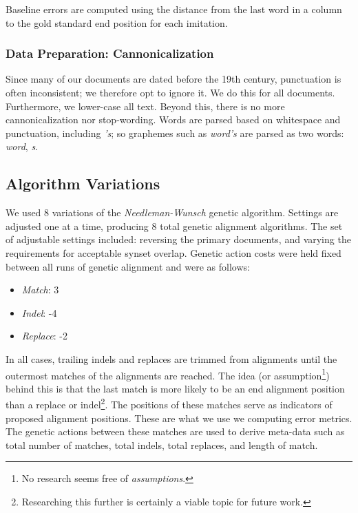 
Baseline errors are computed using the distance from the last word in a column to the gold standard end position for each imitation.

\subsubsection{Data Preparation: Cannonicalization}
Since many of our documents are dated before the 19th century, punctuation is often inconsistent; we therefore opt to ignore it. We do this for all documents. Furthermore, we lower-case all text. Beyond this, there is no more cannonicalization nor stop-wording. Words are parsed based on whitespace and punctuation, including \textit{'s}; so graphemes such as \textit{word's} are parsed as two words: \textit{word}, \textit{s}. %

\subsection{Algorithm Variations}
We used 8 variations of the \textit{Needleman-Wunsch} genetic algorithm. Settings are adjusted one at a time, producing 8 total genetic alignment algorithms. The set of adjustable settings included: reversing the primary documents, %
and varying the requirements for acceptable synset overlap. Genetic action costs were held fixed between all runs of genetic alignment and were as follows:

	\begin{itemize}
		\item \textit{Match}: 3
		\item \textit{Indel}: -4
		\item \textit{Replace}: -2
	\end{itemize}

In all cases, trailing indels and replaces are trimmed from alignments until the outermost matches of the alignments are reached. %
The idea (or assumption\footnote{No research seems free of \textit{assumptions}.}) behind this is that the last match is more likely to be an end alignment position than a replace or indel\footnote{Researching this further is certainly a viable topic for future work.}.
The positions of these matches serve as indicators of proposed alignment positions. These are what we use we computing error metrics. The genetic actions between these matches are used to derive meta-data such as total number of matches, total indels, total replaces, and length of match.

